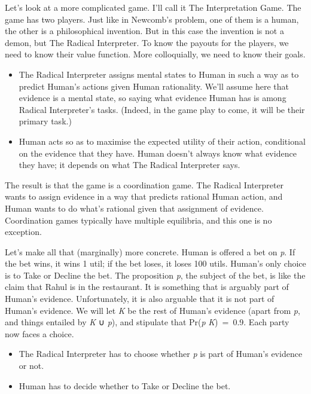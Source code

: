 \documentclass[
  11pt,
]{book}
\providecommand{\tightlist}{%
  \setlength{\itemsep}{0pt}\setlength{\parskip}{0pt}}
\begin{document}
Let's look at a more complicated game. I'll call it The Interpretation Game. The game has two players. Just like in Newcomb's problem, one of them is a human, the other is a philosophical invention. But in this case the invention is not a demon, but The Radical Interpreter. To know the payouts for the players, we need to know their value function. More colloquially, we need to know their goals.

\begin{itemize}
\tightlist
\item
  The Radical Interpreter assigns mental states to Human in such a way as to predict Human's actions given Human rationality. We'll assume here that evidence is a mental state, so saying what evidence Human has is among Radical Interpreter's tasks. (Indeed, in the game play to come, it will be their primary task.)
\item
  Human acts so as to maximise the expected utility of their action, conditional on the evidence that they have. Human doesn't always know what evidence they have; it depends on what The Radical Interpreter says.
\end{itemize}

The result is that the game is a coordination game. The Radical Interpreter wants to assign evidence in a way that predicts rational Human action, and Human wants to do what's rational given that assignment of evidence. Coordination games typically have multiple equilibria, and this one is no exception.

Let's make all that (marginally) more concrete. Human is offered a bet on \emph{p}. If the bet wins, it wins 1 util; if the bet loses, it loses 100 utils. Human's only choice is to Take or Decline the bet. The proposition \emph{p}, the subject of the bet, is like the claim that Rahul is in the restaurant. It is something that is arguably part of Human's evidence. Unfortunately, it is also arguable that it is not part of Human's evidence. We will let \emph{K} be the rest of Human's evidence (apart from \emph{p}, and things entailed by \emph{K} ∪ \emph{p}), and stipulate that Pr(\emph{p} \textbar{} \emph{K})~=~0.9. Each party now faces a choice.

\begin{itemize}
\tightlist
\item
  The Radical Interpreter has to choose whether \emph{p} is part of Human's evidence or not.
\item
  Human has to decide whether to Take or Decline the bet.
\end{itemize}
\end{document}
